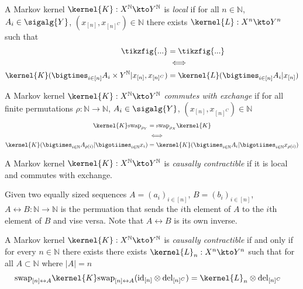 
\begin{definition}[Local]
A Markov kernel $\kernel{K}:X^{\mathbb{N}}\kto Y^{\mathbb{N}}$ is \emph{local} if for all $n\in \mathbb{N}$, $A_i\in \sigalg{Y}$, $(x_{[n]},x_{[n]^C})\in\mathbb{N}$ there exists $\kernel{L}:X^n\kto Y^n$ such that
\begin{align}
	\tikzfig{...} &= \tikzfig{...}\\
	&\iff\\
	\kernel{K}(\bigtimes_{i\in [n]} A_i\times Y^{\mathbb{N}}|x_{[n]},x_{[n]^C}) &= \kernel{L}(\bigtimes_{i\in [n]} A_i|x_{[n]})
\end{align}
\end{definition}

\begin{definition}
A Markov kernel $\kernel{K}:X^{\mathbb{N}}\kto Y^{\mathbb{N}}$ \emph{commutes with exchange} if for all finite permutations $\rho:\mathbb{N}\to\mathbb{N}$, $A_i\in \sigalg{Y}$, $(x_{[n]},x_{[n]^C})\in\mathbb{N}$
\begin{align}
	\kernel{K}\mathrm{swap}_{\rho_Y} &=  \mathrm{swap}_{\rho_X} \kernel{K}\\
	&\iff\\
	\kernel{K}(\bigtimes_{i\in\mathbb{N}} A_{\rho(i)}|\bigotiimes_{i\in \mathbb{N}} x_i) &= \kernel{K}(\bigtimes_{i\in\mathbb{N}} A_{i}|\bigotiimes_{i\in \mathbb{N}} x_{\rho(i)})
\end{align}
\end{definition}


\begin{definition}
A Markov kernel $\kernel{K}:X^{\mathbb{N}}\kto Y^{\mathbb{N}}$ is \emph{causally contractible} if it is local and commutes with exchange.
\end{definition}

\begin{definition}
Given two equally sized sequences $A=(a_i)_{i\in [n]}$, $B=(b_i)_{i\in [n]}$, ${A\leftrightarrow B}:\mathbb{N}\to \mathbb{N}$ is the permuation that sends the $i$th element of $A$ to the $i$th element of $B$ and vise versa. Note that $A\leftrightarrow B$ is its own inverse.
\end{definition}

\begin{theorem}\label{th:equal_of_condits}
A Markov kernel $\kernel{K}:X^{\mathbb{N}}\kto Y^{\mathbb{N}}$ is \emph{causally contractible} if and only if for every $n\in \mathbb{N}$ there exists there exists $\kernel{L}_n:X^n\kto Y^n$ such that for all $A\subset \mathbb{N}$ where $|A|=n$
\begin{align}
    \text{swap}_{[n]\leftrightarrow A} \kernel{K} \text{swap}_{[n]\leftrightarrow A} (\text{id}_{[n]}\otimes \text{del}_{[n]^C}) &= \kernel{L}_n\otimes \mathrm{del}_{[n]^C}
\end{align}
\end{theorem}

